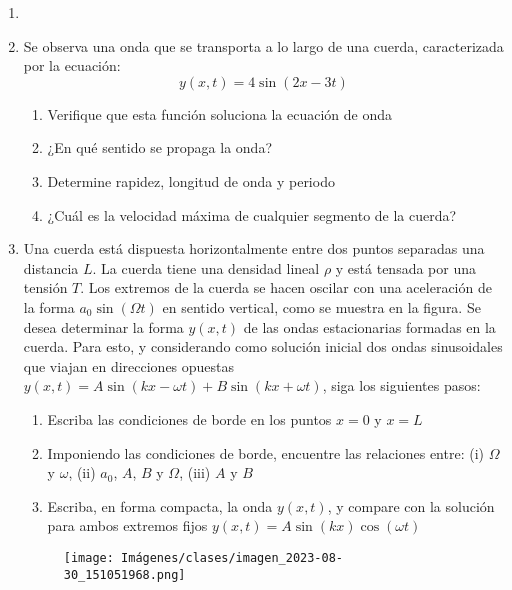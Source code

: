 \documentclass[letterpaper,11pt]{article}
\begin{document}
\begin{enumerate}\setlength{\itemsep}{0.4cm}


\item[]

\item Se observa una onda que se transporta a lo largo de una cuerda, caracterizada por la ecuación:
$$y(x,t) = 4\sin{(2x-3t)}$$

\begin{enumerate}
    \item Verifique que esta función soluciona la ecuación de onda

    \item ¿En qué sentido se propaga la onda?

    \item Determine rapidez, longitud de onda y periodo

    \item ¿Cuál es la velocidad máxima de cualquier segmento de la cuerda?
\end{enumerate}

\item Una cuerda está dispuesta horizontalmente entre dos puntos separadas una distancia $L$. La cuerda tiene una densidad lineal $\rho$ y está tensada por una tensión $T$. Los extremos de la cuerda se hacen oscilar con una aceleración de la forma $a_0\sin{(\Omega t)}$ en sentido vertical, como se muestra en la figura. Se desea determinar la forma $y(x, t)$ de las ondas estacionarias formadas en la cuerda. Para esto, y considerando como solución inicial dos ondas sinusoidales que viajan en direcciones opuestas $y(x,t) = A\sin{(kx-\omega t)} + B\sin{(kx+\omega t)}$, siga los siguientes pasos:

\begin{enumerate}
    \item Escriba las condiciones de borde en los puntos $x=0$ y $x=L$

    \item Imponiendo las condiciones de borde, encuentre las relaciones entre: (i) $\Omega$ y $\omega$, (ii) $a_0$, $A$, $B$ y $\Omega$, (iii) $A$ y $B$

    \item Escriba, en forma compacta, la onda $y(x, t)$, y compare con la solución para ambos extremos fijos $y(x, t) = A\sin{(kx)}\cos{(\omega t)}$
\end{enumerate}

\begin{figure}[H]
    \centering
    \texttt{[image: Imágenes/clases/imagen\_2023-08-30\_151051968.png]}
\end{figure}


\end{enumerate}
\end{document}
